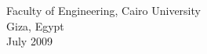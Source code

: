 \documentclass[11pt,doublespace]{SketchThesis}
\begin{document}
 \begin{center}
   Faculty of Engineering, Cairo University \\ Giza, Egypt \\ July 2009
\end{center}

\end{document}
